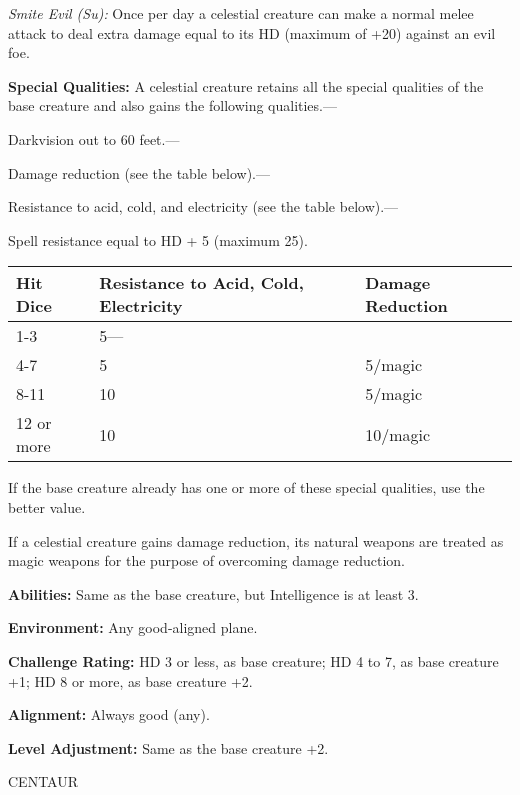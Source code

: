 \documentclass{article}
\begin{document}
\textit{Smite Evil (Su): }Once per day a celestial creature can make a normal melee 
attack to deal extra damage equal to its HD (maximum of +20) against an evil foe.

\textbf{Special Qualities:} A celestial creature retains all the special qualities 
of the base creature and also gains the following qualities.---

Darkvision out to 60 feet.---

Damage reduction (see the table below).---

Resistance to acid, cold, and electricity (see the table below).---

Spell resistance equal to HD + 5 (maximum 25).

\vspace{12pt}
\begin{tabular}{|>{\raggedright}p{42pt}|>{\raggedright}p{152pt}|>{\raggedright}p{80pt}|}
\hline
H\textbf{it Dice} & R\textbf{esistance to Acid, Cold, Electricity} & D\textbf{amage 
Reduction}\tabularnewline
\hline
1-3 & 5--- & \tabularnewline
\hline
4-7 & 5 & 5/magic\tabularnewline
\hline
8-11 & 10 & 5/magic\tabularnewline
\hline
12 or more & 10 & 10/magic\tabularnewline
\hline
\end{tabular}

If the base creature already has one or more of these special qualities, use the 
better value.

If a celestial creature gains damage reduction, its natural weapons are treated 
as magic weapons for the purpose of overcoming damage reduction.

\textbf{Abilities:} Same as the base creature, but Intelligence is at least 3.

\textbf{Environment:} Any good-aligned plane.

\textbf{Challenge Rating:} HD 3 or less, as base creature; HD 4 to 7, as base creature 
+1; HD 8 or more, as base creature +2.

\textbf{Alignment:} Always good (any).

\textbf{Level Adjustment:} Same as the base creature +2.

\vspace{12pt}
{\LARGE{}CENTAUR}
\end{document}
